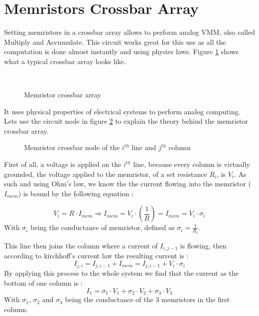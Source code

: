 \section{Memristors Crossbar Array}\label{sec:crossbar}

Setting memristors in a crossbar array allows to perform analog \ac{VMM}, also called Multiply and Accumulate. This circuit works great for this use as all the computation is done almost instantly and using physics laws. Figure \ref{fig:crossbar} shows what a typical crossbar array looks like.

\begin{figure}[H]
  \centering
  \subfloat[Schematics]{}%
  \hfill
  \\
  \caption{Memristor crossbar array}
  \label{fig:crossbar}
\end{figure}

It uses physical properties of electrical systems to perform analog computing. Lets use the circuit node in figure \ref{fig:crossNode} to explain the theory behind the memristor crossbar array.
\begin{figure}[H]
  \centering
  
  \caption{Memristor crossbar node of the $i^{th}$ line and $j^{th}$ column}
  \label{fig:crossNode}
\end{figure}

First of all, a voltage is applied on the $i^{th}$ line, because every column is virtually grounded, the voltage applied to the memristor, of a set resistance $R_i$, is $V_i$. As such and using Ohm's law, we know the the current flowing into the memristor ($I_{mem}$) is bound by the following equation :

\begin{equation}
  V_i = R\cdot I_{mem} \Rightarrow I_{mem} = V_i\cdot (\frac{1}{R})=I_{mem} = V_i\cdot\sigma_i
\end{equation}
With $\sigma_i$ being the conductance of memristor, defined as $\sigma_i=\frac{1}{R_i}$.

This line then joins the column where a current of $I_{i,j-1}$ is flowing, then according to kirchhoff's current law the resulting current is :
\begin{equation}
  I_{j,i} = I_{j,i-1}+I_{mem} = I_{j,i-1} + V_i\cdot\sigma_i
\end{equation}
By applying this process to the whole system we find that the current as the bottom of one column is :
\begin{equation}
  I_1=\sigma_1\cdot V_1 + \sigma_2\cdot V_2 + \sigma_3\cdot V_3
\end{equation}
With $\sigma_1$, $\sigma_2$ and $\sigma_3$ being the conductance of the 3 memristors in the first column.

